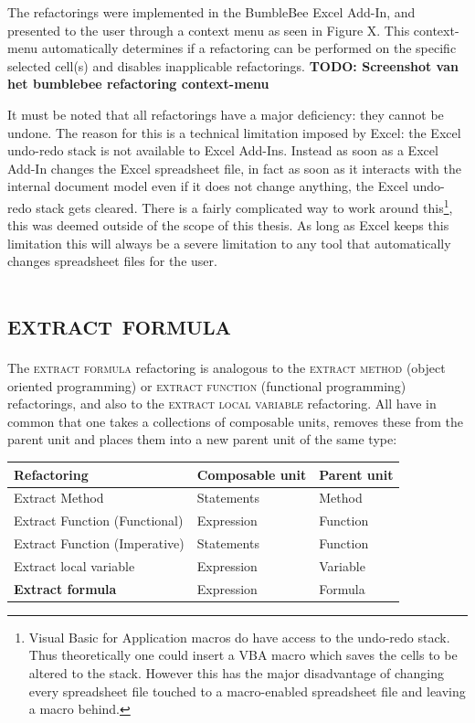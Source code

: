 \documentclass[12pt,a4paper,onecolumn,oneside,parskip]{memoir}
\newcommand{\todo}[1]{\textbf{TODO: #1}}
\newcommand{\rf}[1]{\textsc{\lowercase{#1}}}
\begin{document}
The refactorings were implemented in the BumbleBee Excel Add-In, and presented to the user through a context menu as seen in Figure X.
This context-menu automatically determines if a refactoring can be performed on the specific selected cell(s) and disables inapplicable refactorings.
\todo{Screenshot van het bumblebee refactoring context-menu}

It must be noted that all refactorings have a major deficiency: they cannot be undone.
The reason for this is a technical limitation imposed by Excel: the Excel undo-redo stack is not available to Excel Add-Ins.
Instead as soon as a Excel Add-In changes the Excel spreadsheet file, in fact as soon as it interacts with the internal document model even if it does not change anything, the Excel undo-redo stack gets cleared.
There is a fairly complicated way to work around this\footnote{Visual Basic for Application macros do have access to the undo-redo stack. Thus theoretically one could insert a VBA macro which saves the cells to be altered to the stack. However this has the major disadvantage of changing every spreadsheet file touched to a macro-enabled spreadsheet file and leaving a macro behind.}, this was deemed outside of the scope of this thesis.
As long as Excel keeps this limitation this will always be a severe limitation to any tool that automatically changes spreadsheet files for the user.

\section{\rf{Extract formula}}

The \rf{extract formula} refactoring is analogous to the \rf{extract method} (object oriented programming) or \rf{extract function} (functional programming) refactorings, and also to the \rf{extract local variable} refactoring.
All have in common that one takes a collections of composable units, removes these from the parent unit and places them into a new parent unit of the same type:

\begin{tabular}{@{}lll@{}}
	\toprule
	Refactoring & Composable unit & Parent unit \\
	\midrule
	Extract Method & Statements & Method \\
	Extract Function (Functional) & Expression & Function \\
	Extract Function (Imperative) & Statements & Function \\
	Extract local variable & Expression & Variable \\
	\textbf{Extract formula} & Expression & Formula \\
	\bottomrule
\end{tabular}
\end{document}
